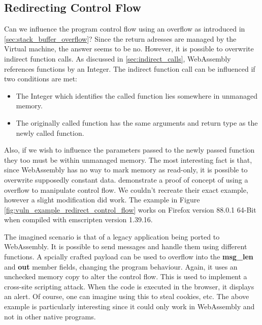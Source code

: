 \documentclass[sigconf]{acmart}
\begin{document}
\subsection{Redirecting Control Flow}
Can we influence the program control flow using an overflow as introduced in \ref{sec:stack_buffer_overflow}? Since the return adresses are managed by the Virtual machine, the answer seems to be no. However, it is possible to overwrite indirect function calls. As discussed in \ref{sec:indirect_calls}, WebAssembly references functions by an Integer. The indirect function call can be influenced if two conditions are met:

\begin{itemize}
\item The Integer which identifies the called function lies somewhere in unmanaged memory.
\item The originally called function has the same arguments and return type as the newly called function.
\end{itemize}

Also, if we wish to influence the parameters passed to the newly passed function they too must be within unmanaged memory. The most interesting fact is that, since WebAssembly has no way to mark memory as read-only, it is possible to overwrite supposedly constant data. \cite{mcfadden_security_2018} demonstrate a proof of concept of using a overflow to manipulate control flow. We couldn't recreate their exact example, however a slight modification did work. The example in Figure \ref{fig:vuln_example_redirect_control_flow} works on Firefox version 88.0.1 64-Bit when compiled with emscripten version 1.39.16.

The imagined scenario is that of a legacy application being ported to WebAssembly. It is possible to send messages and handle them using different functions. A spcially crafted payload can be used to overflow into the \textbf{msg\_len} and \textbf{out} member fields, changing the program behaviour. Again, it uses an unchecked memory copy to alter the control flow. This is used to implement a cross-site scripting attack. When the code is executed in the browser, it displays an alert. Of course, one can imagine using this to steal cookies, etc.
The above example is particularly interesting since it could only work in WebAssembly and not in other native programs.
\end{document}
